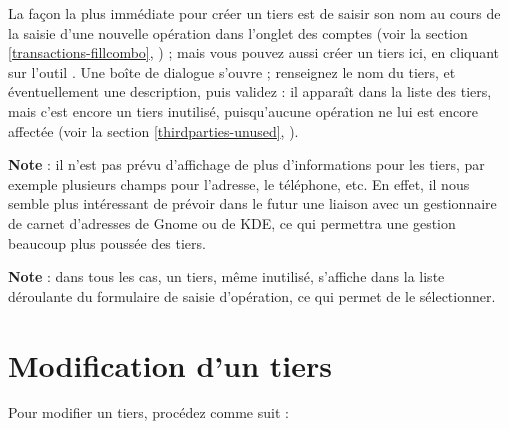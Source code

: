 \noindent La façon la plus immédiate pour créer un tiers est de saisir son nom au cours de la saisie d'une nouvelle opération dans l'onglet des comptes (voir la section \vref{transactions-fillcombo}, ) ; mais vous pouvez aussi créer un tiers ici, en cliquant sur l'outil . Une boîte de dialogue s'ouvre ; renseignez le nom du tiers, et éventuellement une description, puis validez : il apparaît dans la liste des tiers, mais c'est encore un tiers inutilisé, puisqu'aucune opération ne lui est encore affectée (voir la section \vref{thirdparties-unused}, ).

\textbf{Note} : il n'est pas prévu d'affichage de plus d'informations pour les tiers, par exemple plusieurs champs pour l'adresse, le téléphone, etc. En effet, il nous semble plus intéressant de prévoir dans le futur une liaison avec un gestionnaire de carnet d'adresses de \gls{Gnome} ou de \gls{KDE}, ce qui permettra une gestion beaucoup plus poussée des tiers.

\textbf{Note} : dans tous les cas, un tiers, même inutilisé, s'affiche dans la liste déroulante du formulaire de saisie d'opération, ce qui permet de le sélectionner.


\section{Modification d'un tiers\label{thirdparties-modify}}


Pour modifier un tiers, procédez comme suit :


